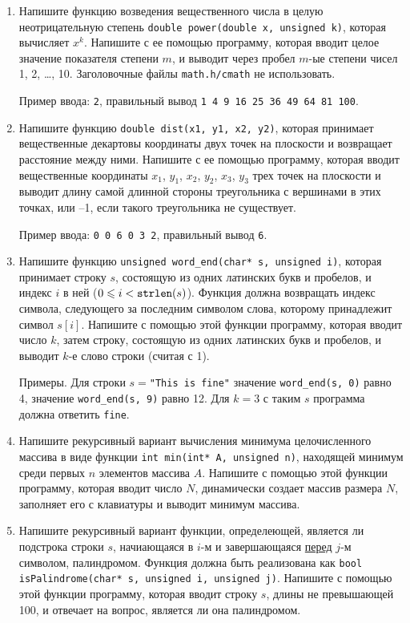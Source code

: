 \documentclass{article}
\begin{document}
\begin{enumerate}
\item
Напишите функцию возведения вещественного числа в целую неотрицательную степень \texttt{double power(double x, unsigned k)}, которая вычисляет $x^k$. Напишите с ее помощью программу, которая вводит целое значение показателя степени $m$, и выводит через пробел $m$-ые степени чисел 1, 2, \ldots, 10. Заголовочные файлы \texttt{math.h/cmath} не использовать.

Пример ввода: \texttt{2}, правильный вывод \texttt{1 4 9 16 25 36 49 64 81 100}.

\item
Напишите функцию \texttt{double dist(x1, y1, x2, y2)}, которая принимает вещественные декартовы координаты двух точек на плоскости и возвращает расстояние между ними. Напишите с ее помощью программу, которая вводит вещественные координаты $x_1$, $y_1$, $x_2$, $y_2$, $x_3$, $y_3$ трех точек на плоскости и выводит длину самой длинной стороны треугольника с вершинами в этих точках, или –1, если такого треугольника не существует.

Пример ввода: \texttt{0 0 6 0 3 2}, правильный вывод \texttt{6}.

\item
Напишите функцию \texttt{unsigned word\_end(char* s, unsigned i)}, 
которая принимает строку $s$, состоящую из одних латинских букв и пробелов, и индекс $i$ в ней ($0 \leqslant i<\mbox{\texttt{strlen}}(s)$). Функция должна возвращать индекс символа, следующего за последним символом слова, которому принадлежит символ $s[i]$. Напишите с помощью этой функции программу, которая вводит число $k$, затем строку, состоящую из одних латинских букв и пробелов, и выводит $k$-е слово строки (считая с 1).

Примеры. Для строки $s={}$\verb!"!\texttt{This is fine"}
значение \texttt{word\_end(s, 0)}  равно 4,  значение \texttt{word\_end(s, 9)} равно 12.
Для $k=3$ с таким $s$ программа должна ответить \texttt{fine}.

\item
Напишите рекурсивный вариант вычисления минимума целочисленного массива в виде функции \texttt{int min(int* A, unsigned n)}, находящей минимум среди первых $n$ элементов массива $A$. Напишите с помощью этой функции программу, которая вводит число $N$, динамически создает массив размера $N$, заполняет его с клавиатуры и выводит минимум массива.

\item
Напишите рекурсивный вариант функции, определеющей, является ли подстрока строки $s$, начиающаяся в $i$-м и завершающаяся \underline{перед} $j$-м символом, палиндромом. Функция должна быть реализована как \texttt{bool isPalindrome(char* s, unsigned i, unsigned j)}. Напишите с помощью этой функции программу, которая вводит строку $s$, длины не превышающей 100, и отвечает на вопрос, является ли она палиндромом.

\end{enumerate}
\end{document}
